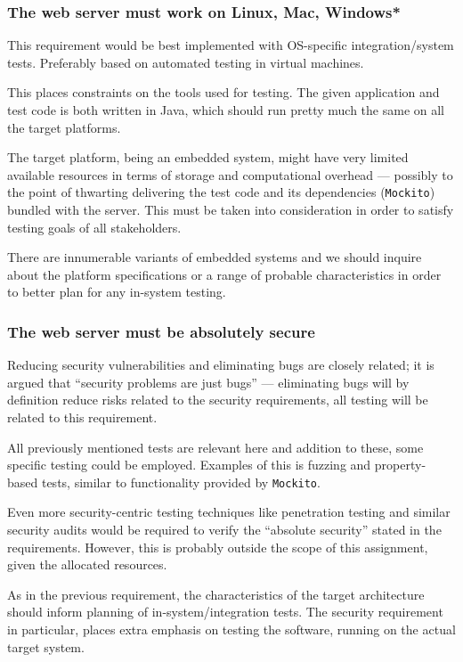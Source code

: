 \subsubsection{The web server must work on Linux, Mac, Windows*}
This requirement would be best implemented with OS-specific integration/system
tests. Preferably based on automated testing in virtual machines.

This places constraints on the tools used for testing. The given application
and test code is both written in Java, which should run pretty much the same on
all the target platforms.

The target platform, being an embedded system, might have very limited
available resources in terms of storage and computational overhead --- possibly
to the point of thwarting delivering the test code and its dependencies
(\texttt{Mockito}) bundled with the server. This must be taken into
consideration in order to satisfy testing goals of all stakeholders.

There are innumerable variants of embedded systems and we should inquire about
the platform specifications or a range of probable characteristics in order to
better plan for any in-system testing.


\subsubsection{The web server must be absolutely secure}
Reducing security vulnerabilities and eliminating bugs are closely related; it
is argued\cite{torvalds-security-morons} that ``security problems are just
bugs'' \cite{torvalds-security-bugs} --- eliminating bugs will by definition
reduce risks related to the security requirements, all testing will be related
to this requirement.

All previously mentioned tests are relevant here and addition to these, some
specific testing could be employed. Examples of this is fuzzing and
property-based tests, similar to functionality provided by \texttt{Mockito}.

Even more security-centric testing techniques like penetration testing and
similar security audits would be required to verify the ``absolute security''
stated in the requirements. However, this is probably outside the scope of this
assignment, given the allocated resources.

As in the previous requirement, the characteristics of the target architecture
should inform planning of in-system/integration tests.  The security
requirement in particular, places extra emphasis on testing the software,
running on the actual target system.


